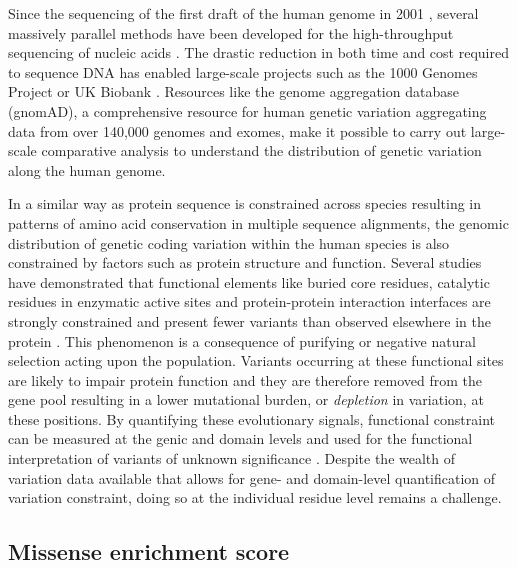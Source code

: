 Since the sequencing of the first draft of the human genome in 2001 \cite{CONSORTIUM_2001_GENOME}, several massively parallel methods have been developed for the high-throughput sequencing of nucleic acids \cite{KASIANOWICZ_1996_NANOPORE, MARGULIES_2005_PYROSEQUENCING, BENTLEY_2008_ILLUMINA, EID_2009_PACBIO, ROTHBERG_2011_IONTORRENT}. The drastic reduction in both time and cost required to sequence DNA has enabled large-scale projects such as the 1000 Genomes Project \cite{AUTON_2015_1000KG} or UK Biobank \cite{BYCROFT_2018_UKBIOBANK}. Resources like the genome aggregation database (gnomAD), a comprehensive resource for human genetic variation aggregating data from over 140,000 genomes and exomes, make it possible to carry out large-scale comparative analysis to understand the distribution of genetic variation along the human genome.

In a similar way as protein sequence is constrained across species resulting in patterns of amino acid conservation in multiple sequence alignments, the genomic distribution of genetic coding variation within the human species is also constrained by factors such as protein structure and function. Several studies have demonstrated that functional elements like buried core residues, catalytic residues in enzymatic active sites and protein-protein interaction interfaces are strongly constrained and present fewer variants than observed elsewhere in the protein \cite{GONG_2010_CONSTRAINT, BEER_2013_CONSTRAINT, DAVID_2015_CONSTRAINT, SIVLEY_2018_CONSTRAINT}. This phenomenon is a consequence of purifying or negative natural selection acting upon the population. Variants occurring at these functional sites are likely to impair protein function and they are therefore removed from the gene pool resulting in a lower mutational burden, or \textit{depletion} in variation, at these positions. By quantifying these evolutionary signals, functional constraint can be measured at the genic \cite{PETROVSKI_2013_CONSTRAINT} and domain \cite{GUSSOW_2016_CONSTRAINT} levels and used for the functional interpretation of variants of unknown significance \cite{LI_2022_CONSTRAINT}. Despite the wealth of variation data available that allows for gene- and domain-level quantification of variation constraint, doing so at the individual residue level remains a challenge.

\subsection{Missense enrichment score}

